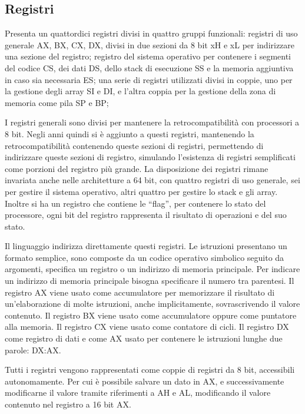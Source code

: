 \documentclass{article}
\numberwithin{equation}{subsection}
\begin{document}
\subsection{Registri}

Presenta un quattordici registri divisi in quattro gruppi funzionali: registri di uso generale AX, BX, CX, DX, divisi in due sezioni da 8 bit xH e xL per indirizzare una sezione 
del registro; registro del sistema operativo per contenere i segmenti del 
codice CS, dei dati DS, dello stack di esecuzione SS e la memoria aggiuntiva in caso sia necessaria ES; una serie di registri utilizzati divisi in coppie, uno per la 
gestione degli array SI e DI, e l'altra coppia per la gestione della zona di memoria come pila SP e BP; 


I registri generali sono divisi per mantenere la retrocompatibilità con processori a 8 bit. 
Negli anni quindi si è aggiunto a questi registri, mantenendo la retrocompatibilità contenendo queste sezioni di registri, permettendo di indirizzare queste sezioni di 
registro, simulando l'esistenza di registri semplificati come porzioni del registro più grande. 
La disposizione dei registri rimane invariata anche nelle architetture a 64 bit, con quattro registri di uso generale, sei per gestire il sistema operativo, altri quattro per 
gestire lo stack e gli array. Inoltre si ha un registro che contiene le ``flag'', per contenere lo stato del processore, ogni bit del registro rappresenta il risultato 
di operazioni e del suo stato. 

Il linguaggio indirizza direttamente questi registri. Le istruzioni presentano un formato semplice, sono composte da un codice operativo simbolico seguito da argomenti, 
specifica un registro o un indirizzo di memoria principale. Per indicare un indirizzo di memoria principale bisogna specificare il numero tra parentesi. 
Il registro AX viene usato come accumulatore per memorizzare il risultato di un'elaborazione di molte istruzioni, anche implicitamente, sovrascrivendo il valore contenuto. 
Il registro BX viene usato come accumulatore oppure come puntatore alla memoria. Il registro CX viene usato come contatore di cicli. Il registro DX come registro di dati e come AX 
usato per contenere le istruzioni lunghe due parole: DX:AX. 

Tutti i registri vengono rappresentati come coppie di registri da 8 bit, accessibili autonomamente. Per cui è possibile salvare un dato in AX, e successivamente modificarne 
il valore tramite riferimenti a AH e AL, modificando il valore contenuto nel registro a 16 bit AX. 
\end{document}
